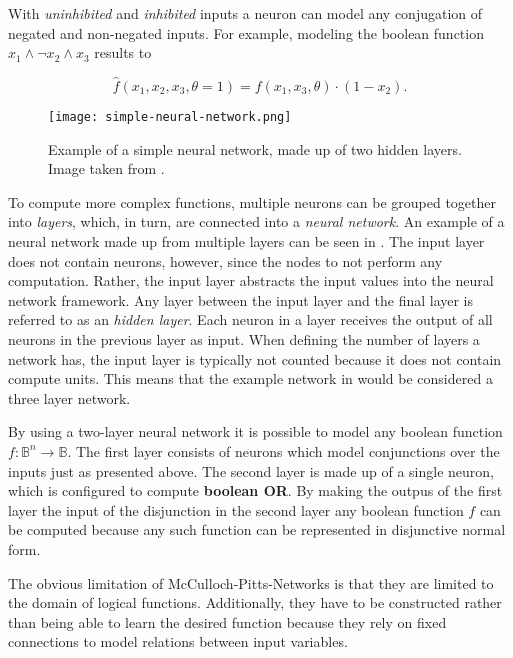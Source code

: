 With \textit{uninhibited} and \textit{inhibited} inputs a neuron can model any conjugation of negated and non-negated inputs.
For example, modeling the boolean function $x_1 \wedge \neg x_2 \wedge x_3$ results to

\begin{equation}
    \label{eq:conjunction-negated}
    \hat{f}(x_1, x_2, x_3, \theta=1) = f(x_1, x_3, \theta) \cdot (1 - x_2).
\end{equation}

\begin{figure}[htb!]
    \centering
    \texttt{[image: simple-neural-network.png]}
    \caption{Example of a simple neural network, made up of two hidden layers. Image taken from \cite{dertat_applied_2017-1}.}
    \label{fig:simple-neural-network}
\end{figure}

To compute more complex functions, multiple neurons can be grouped together into \textit{layers}, which, in turn, are connected into a \textit{neural network}.
An example of a neural network made up from multiple layers can be seen in .
The input layer does not contain neurons, however, since the nodes to not perform any computation.
Rather, the input layer abstracts the input values into the neural network framework.
Any layer between the input layer and the final layer is referred to as an \textit{hidden layer}.
Each neuron in a layer receives the output of all neurons in the previous layer as input.
When defining the number of layers a network has, the input layer is typically not counted because it does not contain compute units.
This means that the example network in  would be considered a three layer network.

By using a two-layer neural network it is possible to model any boolean function $f: \mathbb{B}^n \to \mathbb{B}$.
The first layer consists of neurons which model conjunctions over the inputs just as presented above.
The second layer is made up of a single neuron, which is configured to compute \textbf{boolean OR}.
By making the outpus of the first layer the input of the disjunction in the second layer any boolean function $f$ can be computed because any such function can be represented in disjunctive normal form.

The obvious limitation of McCulloch-Pitts-Networks is that they are limited to the domain of logical functions.
Additionally, they have to be constructed rather than being able to learn the desired function because they rely on fixed connections to model relations between input variables.

